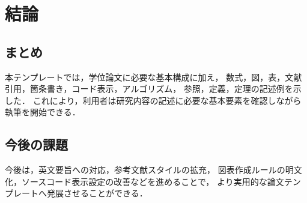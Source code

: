 
\chapter{結論}

\section{まとめ}

本テンプレートでは，学位論文に必要な基本構成に加え，
数式，図，表，文献引用，箇条書き，コード表示，アルゴリズム，
参照，定義，定理の記述例を示した．
これにより，利用者は研究内容の記述に必要な基本要素を確認しながら
執筆を開始できる．

\section{今後の課題}

今後は，英文要旨への対応，参考文献スタイルの拡充，
図表作成ルールの明文化，ソースコード表示設定の改善などを進めることで，
より実用的な論文テンプレートへ発展させることができる．
